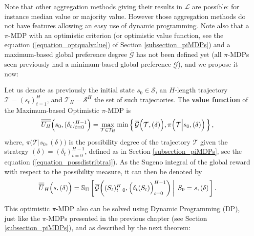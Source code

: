 Note that other aggregation methods giving their results in $\mathcal{L}$ are possible: 
for instance median value or majority value.
However those aggregation methods do not have features
allowing an easy use of dynamic programming.
Note also that a $\pi$-MDP with an optimistic criterion (or optimistic value function, see the equation (\ref{equation_optqualvalue}) of Section \ref{subsection_piMDPs})
and a maximum-based global preference degree $\overline{\mathcal{G}}$ has not been defined yet 
(all $\pi$-MDPs seen previously had a minimum-based global preference $\underline{\mathcal{G}}$),
and we propose it now:

\begin{Def}
\label{def_optpiMDPmaxbased}
Let us denote as previously the initial state $s_0 \in \mathcal{S}$,
an $H$-length trajectory $\mathcal{T} = (s_t)_{t=1}^H$,
and $\mathcal{T}_H = \mathcal{S}^{H}$ the set of such trajectories.
The \textbf{value function} of the Maximum-based Optimistic $\pi$-MDP is
\[ \overline{\overline{U_H}} \Big( s_0,(\delta_t)_{t=0}^{H-1} \Big) = \max_{\mathcal{T} \in \mathcal{T}_H} \min \left\{ \left.  \overline{\mathcal{G}} \Big( \mathcal{T}, (\delta) \Big), \pi \Big( \mathcal{T} \Big\vert s_0, (\delta) \Big)  \right. \right\}, \]
where, $\pi \Big( \mathcal{T} \Big\vert s_0, (\delta) \Big)$ is the possibility degree of the 
trajectory $\mathcal{T}$ given the strategy $(\delta) = (\delta_t)_{t=0}^{H-1}$, defined as in Section \ref{subsection_piMDPs}, see the equation (\ref{equation_possdistribtraj}).
As the Sugeno integral of the global reward with respect to the possibility measure, 
it can then be denoted by
\[ \overline{\overline{U}}_H \Big( s, (\delta) \Big) = \mathbb{S}_{\Pi} \left[ \left.  \overline{\mathcal{G}} \bigg( (S_t)_{t=0}^{H}, \Big(\delta_t(S_t)\Big)_{t=0}^{H-1}  \bigg) \, \right| \left. \, S_0 = s, (\delta)  \right. \right]. \]
\end{Def}
This optimistic $\pi$-MDP also can be solved using Dynamic Programming (DP),  
just like the $\pi$-MDPs presented in the previous chapter (see Section \ref{subsection_piMDPs}),
and as described by the next theorem:
